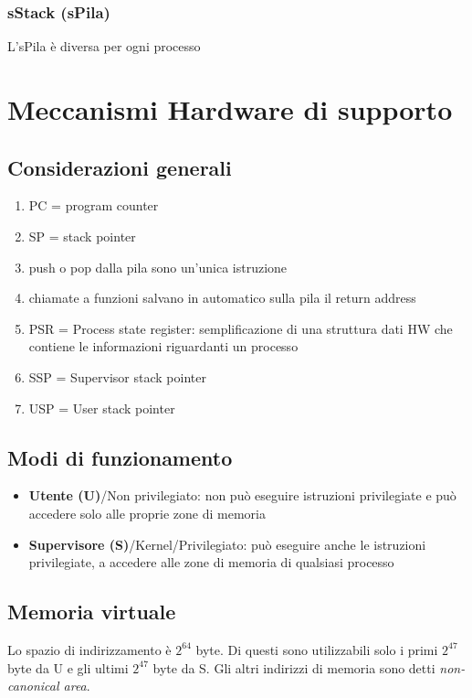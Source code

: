 \documentclass[12pt, a4paper]{report}
\begin{document}
\subsection{sStack (sPila)}
L'sPila è diversa per ogni processo

\chapter{Meccanismi Hardware di supporto}

\section{Considerazioni generali}
\begin{enumerate}
	\item PC = program counter
	\item SP = stack pointer
	\item push o pop dalla pila sono un'unica istruzione
	\item chiamate a funzioni salvano in automatico sulla pila il return address
	\item PSR = Process state register: semplificazione di una struttura dati HW
		che contiene le informazioni riguardanti un processo
	\item SSP = Supervisor stack pointer
	\item USP = User stack pointer
\end{enumerate}

\section{Modi di funzionamento}
\begin{itemize}
	\item \textbf{Utente (U)}/Non privilegiato: non può eseguire istruzioni
		privilegiate e può accedere solo alle proprie zone di memoria
	\item \textbf{Supervisore (S)}/Kernel/Privilegiato: può eseguire anche le
		istruzioni privilegiate, a accedere alle zone di memoria di qualsiasi
		processo
\end{itemize}
\section{Memoria virtuale}
Lo spazio di indirizzamento è $2^{64}$ byte. Di questi sono utilizzabili solo i
primi $2^{47}$ byte da U e gli ultimi $2^{47}$ byte da S. Gli altri indirizzi di
memoria sono detti \textit{non-canonical area}.
\end{document}
